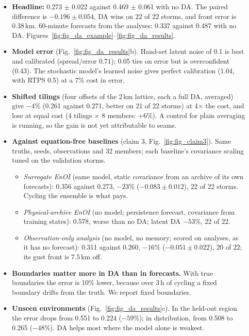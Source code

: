 \documentclass[11pt]{article}
\begin{document}
\begin{itemize}
\item \textbf{Headline:} 0.273 $\pm$ 0.022 against 0.469 $\pm$ 0.061 with no DA. The paired difference is $-0.196\pm0.054$, DA wins on 22 of 22 storms, and front error is 0.38\,km. 60-minute forecasts from the analyses: 0.337 against 0.487 with no DA. Figures~\ref{fig:fig_da_example}--\ref{fig:fig_da_results}.
\item \textbf{Model error} (Fig.~\ref{fig:fig_da_results}b). Hand-set latent noise of 0.1 is best and calibrated (spread/error 0.71); 0.05 ties on error but is overconfident (0.43). The stochastic model's learned noise gives perfect calibration (1.04, with RTPS 0.5) at a 7\% cost in error.
\item \textbf{Shifted tilings} (four offsets of the 2\,km lattice, each a full DA, averaged) give $-4$\% (0.261 against 0.271, better on 21 of 22 storms) at 4$\times$ the cost, and lose at equal cost (4 tilings $\times$ 8 members: $+6$\%). A control for plain averaging is running, so the gain is not yet attributable to seams.
\item \textbf{Against equation-free baselines} (claim 3, Fig.~\ref{fig:fig_claim3}). Same truths, seeds, observations and 32 members; each baseline's covariance scaling tuned on the validation storms.
  \begin{itemize}
  \item \emph{Surrogate EnOI} (same model, static covariance from an archive of its own forecasts): 0.356 against 0.273, $-23$\% ($-0.083\pm0.012$), 22 of 22 storms. Cycling the ensemble is what pays.
  \item \emph{Physical-archive EnOI} (no model; persistence forecast, covariance from training states): 0.578, worse than no DA; latent DA $-53$\%, 22 of 22.
  \item \emph{Observation-only analysis} (no model, no memory; scored on analyses, as it has no forecast): 0.311 against 0.260, $-16$\% ($-0.051\pm0.022$), 20 of 22; its gust front is 7.5\,km off.
  \end{itemize}
\item \textbf{Boundaries matter more in DA than in forecasts.} With true boundaries the error is 10\% lower, because over 3\,h of cycling a fixed boundary drifts from the truth. We report fixed boundaries.
\item \textbf{Unseen environments} (Fig.~\ref{fig:fig_da_results}c). In the held-out region the error drops from 0.551 to 0.224 ($-59$\%); in distribution, from 0.508 to 0.265 ($-48$\%). DA helps most where the model alone is weakest.

\end{itemize}
\end{document}
